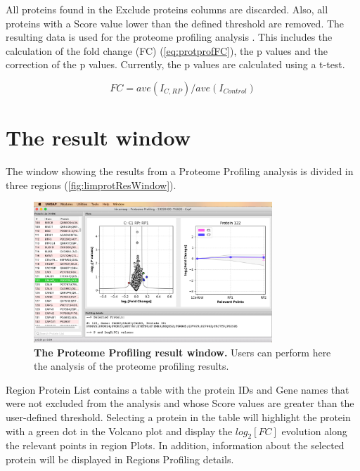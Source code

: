 All proteins found in the Exclude proteins columns are discarded. Also, all proteins
with a Score value lower than the defined threshold are removed. The resulting data
is used for the proteome profiling analysis \cite{Aguilan2020}. This includes the
calculation of the fold change (FC) (\autoref{eq:protprofFC}), the p values and the correction
of the p values. Currently, the p values are calculated using a t-test.

\begin{equation}
\label{eq:protprofFC}
FC = ave(I_{C, RP}) / ave(I_{Control})
\end{equation}

\section{The result window}

The window showing the results from a Proteome Profiling analysis is divided in three
regions (\autoref{fig:limprotResWindow}).

\begin{figure}[h]
    \centering
    \includegraphics[width=0.8\textwidth]{./IMAGES/MOD-PROTPROF/protprof-frag.jpg}
    \caption[The Proteome Profiling result window]{\textbf{The Proteome Profiling
    result window.} Users can perform here the analysis of the proteome profiling
    results.} 
    \label{fig:protprofResultsWindow}
    \vspace{-5pt} 	
\end{figure}

Region Protein List contains a table with the protein IDs and Gene names that were not
excluded from the analysis and whose Score values are greater than the user-defined
threshold. Selecting a protein in the table will highlight the protein with a green
dot in the Volcano plot and display the $log_2[FC]$ evolution along the relevant points
in region Plots. In addition, information about the selected protein will be displayed
in Regions Profiling details.

